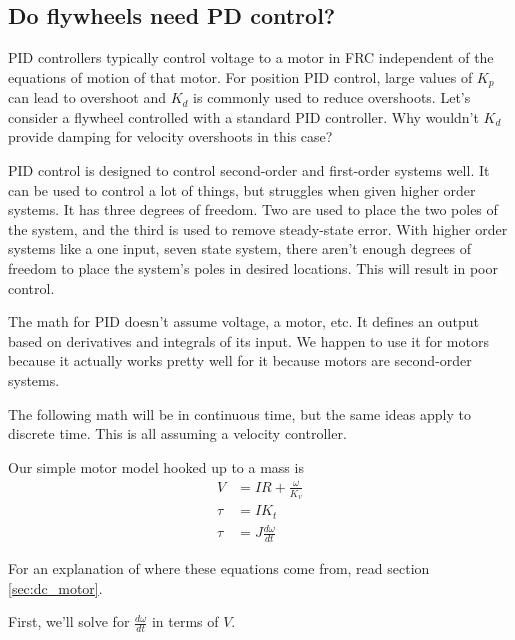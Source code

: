 \subsection{Do flywheels need PD control?}

PID controllers typically control voltage to a motor in FRC independent of the
equations of motion of that motor. For position PID control, large values of
$K_p$ can lead to overshoot and $K_d$ is commonly used to reduce overshoots.
Let's consider a flywheel controlled with a standard PID controller. Why
wouldn't $K_d$ provide damping for velocity overshoots in this case?

PID control is designed to control second-order and first-order \glspl{system}
well. It can be used to control a lot of things, but struggles when given higher
order \glspl{system}. It has three degrees of freedom. Two are used to place the
two poles of the \gls{system}, and the third is used to remove steady-state
error. With higher order \glspl{system} like a one input, seven \gls{state}
\gls{system}, there aren't enough degrees of freedom to place the \gls{system}'s
poles in desired locations. This will result in poor control.

The math for PID doesn't assume voltage, a motor, etc. It defines an output
based on derivatives and integrals of its input. We happen to use it for motors
because it actually works pretty well for it because motors are second-order
\glspl{system}.

The following math will be in continuous time, but the same ideas apply to
discrete time. This is all assuming a velocity controller.

Our simple motor model hooked up to a mass is
\begin{align}
  V &= IR + \frac{\omega}{K_v}
    \label{eq:steady-state_error_classical_flywheel_1} \\
  \tau &= I K_t \label{eq:steady-state_error_classical_flywheel_2} \\
  \tau &= J \frac{d\omega}{dt}
    \label{eq:steady-state_error_classical_flywheel_3}
\end{align}

For an explanation of where these equations come from, read section
\ref{sec:dc_motor}.

First, we'll solve for $\frac{d\omega}{dt}$ in terms of $V$.

